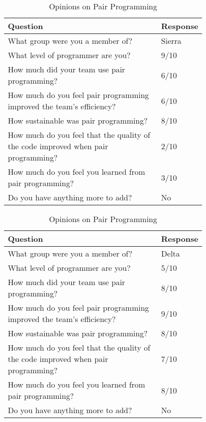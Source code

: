 \documentclass{article}
\begin{document}
\begin{table}[ht]
\centering
\renewcommand{\arraystretch}{1.3}
\caption{Opinions on Pair Programming}
\begin{tabular}{|p{0.8\linewidth}|l|}
\hline
\textbf{Question} & \textbf{Response} \\
\hline
What group were you a member of? & Sierra \\
\hline 
What level of programmer are you? & 9/10\\
\hline 
How much did your team use pair programming? & 6/10\\
\hline 
How much do you feel pair programming improved the team's efficiency? & 6/10\\
\hline 
How sustainable was pair programming? & 8/10\\
\hline 
How much do you feel that the quality of the code improved when pair programming? & 2/10\\
\hline 
How much do you feel you learned from pair programming? & 3/10\\
\hline 
Do you have anything more to add? &  No\\
\hline
\end{tabular}
\end{table}

\begin{table}[ht]
\centering
\renewcommand{\arraystretch}{1.3}
\caption{Opinions on Pair Programming}
\begin{tabular}{|p{0.8\linewidth}|l|}
\hline
\textbf{Question} & \textbf{Response} \\
\hline
What group were you a member of? & Delta \\
\hline 
What level of programmer are you? & 5/10\\
\hline 
How much did your team use pair programming? & 8/10\\
\hline 
How much do you feel pair programming improved the team's efficiency? & 9/10\\
\hline 
How sustainable was pair programming? & 8/10\\
\hline 
How much do you feel that the quality of the code improved when pair programming? & 7/10\\
\hline 
How much do you feel you learned from pair programming? & 8/10\\
\hline 
Do you have anything more to add? &  No\\
\hline
\end{tabular}
\end{table}
\end{document}
